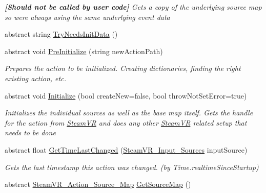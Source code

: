 \begin{DoxyCompactItemize}
\begin{DoxyCompactList}\small\item\em {\bfseries{\mbox{[}Should not be called by user code\mbox{]}}} Gets a copy of the underlying source map so we\textquotesingle{}re always using the same underlying event data \end{DoxyCompactList}\item 
abstract string \mbox{\hyperlink{class_valve_1_1_v_r_1_1_steam_v_r___action_af53dc99944ee543c7570e6defc55aa48}{Try\+Needs\+Init\+Data}} ()
\item 
abstract void \mbox{\hyperlink{class_valve_1_1_v_r_1_1_steam_v_r___action_a8ead085a816500f060b6cfbc96b8da87}{Pre\+Initialize}} (string new\+Action\+Path)
\begin{DoxyCompactList}\small\item\em Prepares the action to be initialized. Creating dictionaries, finding the right existing action, etc. \end{DoxyCompactList}\item 
abstract void \mbox{\hyperlink{class_valve_1_1_v_r_1_1_steam_v_r___action_a29bea2023c1139d9bd612b82d02f8d61}{Initialize}} (bool create\+New=false, bool throw\+Not\+Set\+Error=true)
\begin{DoxyCompactList}\small\item\em Initializes the individual sources as well as the base map itself. Gets the handle for the action from \mbox{\hyperlink{class_valve_1_1_v_r_1_1_steam_v_r}{Steam\+VR}} and does any other \mbox{\hyperlink{class_valve_1_1_v_r_1_1_steam_v_r}{Steam\+VR}} related setup that needs to be done \end{DoxyCompactList}\item 
abstract float \mbox{\hyperlink{class_valve_1_1_v_r_1_1_steam_v_r___action_ac8b7caef88740be5ec2ff78fd8fcbfad}{Get\+Time\+Last\+Changed}} (\mbox{\hyperlink{namespace_valve_1_1_v_r_a82e5bf501cc3aa155444ee3f0662853f}{Steam\+V\+R\+\_\+\+Input\+\_\+\+Sources}} input\+Source)
\begin{DoxyCompactList}\small\item\em Gets the last timestamp this action was changed. (by Time.\+realtime\+Since\+Startup) \end{DoxyCompactList}\item 
abstract \mbox{\hyperlink{class_valve_1_1_v_r_1_1_steam_v_r___action___source___map}{Steam\+V\+R\+\_\+\+Action\+\_\+\+Source\+\_\+\+Map}} \mbox{\hyperlink{class_valve_1_1_v_r_1_1_steam_v_r___action_a59d2546a9c1a9097e2243e1537f1bfe3}{Get\+Source\+Map}} ()
\item 

\end{DoxyCompactItemize}
